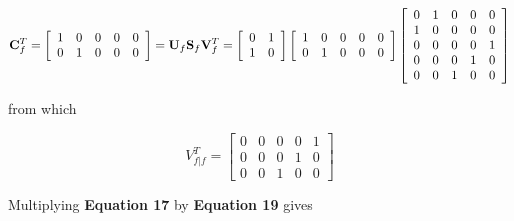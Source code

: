 \documentclass[11pt, titlepage, twoside]{article}
\begin{document}
\begin{MPEquation}[!ht]
\begin{equation}
{\bf{C}}_f^T = \left[ {\begin{array}{*{20}{c}}
1&0&0&0&0\\
0&1&0&0&0
\end{array}} \right] = {{\bf{U}}_f}{{\bf{S}}_f}{\bf{V}}_f^T = \left[ {\begin{array}{*{20}{c}}
0&1\\
1&0
\end{array}} \right]\left[ {\begin{array}{*{20}{c}}
1&0&0&0&0\\
0&1&0&0&0
\end{array}} \right]\left[ {\begin{array}{*{20}{c}}
0&1&0&0&0\\
1&0&0&0&0\\
0&0&0&0&1\\
0&0&0&1&0\\
0&0&1&0&0
\end{array}} \right]
\end{equation}
\label{MPEquationElement:E2D33DA1-0982-4A5F-DC28-4C631C515E0C}
\end{MPEquation}
from which


\begin{MPEquation}[!ht]
\begin{equation}
V_{\left. f \right|f}^T = \left[ {\begin{array}{*{20}{c}}
0&0&0&0&1\\
0&0&0&1&0\\
0&0&1&0&0
\end{array}} \right]
\end{equation}
\label{MPEquationElement:48C2AF36-F98D-46E0-8F6B-35A5D203B200}
\end{MPEquation}
Multiplying \textbf{Equation 17} by \textbf{Equation 19} gives
\end{document}

